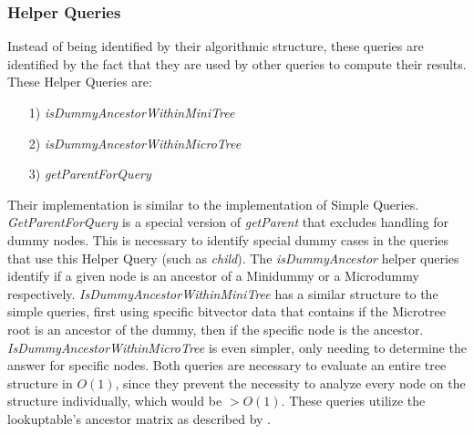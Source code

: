 \documentclass{article}
\begin{document}
\subsubsection{Helper Queries}
Instead of being identified by their algorithmic structure, these queries are identified by the fact that they are used by other queries to compute their results.\\
These Helper Queries are:
\begin{itemize}
	\item[1)] \textit{isDummyAncestorWithinMiniTree}
	\item[2)] \textit{isDummyAncestorWithinMicroTree}
	\item[3)] \textit{getParentForQuery}
\end{itemize}
Their implementation is similar to the implementation of Simple Queries.\\
\textit{GetParentForQuery} is a special version of \textit{getParent} that excludes handling for dummy nodes. This is necessary to identify special dummy cases in the queries that use this Helper Query (such as \textit{child}).
The \textit{isDummyAncestor} helper queries identify if a given node is an ancestor of a Minidummy or a Microdummy respectively. \textit{IsDummyAncestorWithinMiniTree} has a similar structure to the simple queries, first using specific bitvector data that contains if the Microtree root is an ancestor of the dummy, then if the specific node is the ancestor. \textit{IsDummyAncestorWithinMicroTree} is even simpler, only needing to determine the answer for specific nodes. Both queries are necessary to evaluate an entire tree structure in $O(1)$, since they prevent the necessity to analyze every node on the structure individually, which would be $> O(1)$. These queries utilize the lookuptable's ancestor matrix as described by \cite{farzanMunro}.
\end{document}
